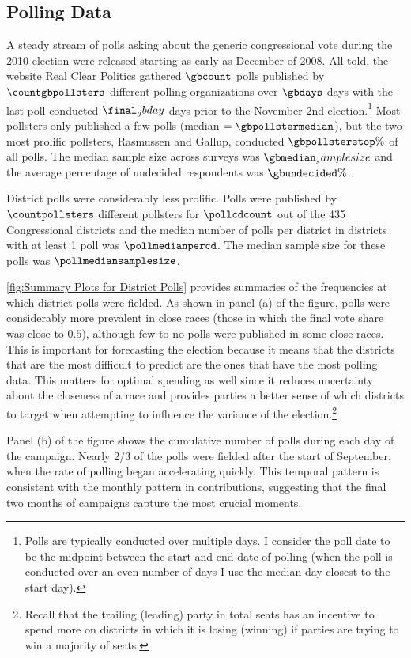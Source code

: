 \documentclass[12pt,final,fleqn]{article}
\theoremstyle{plain}
\begin{document}
\subsection{Polling Data}
A steady stream of polls asking about the generic congressional vote during the 2010 election were released starting as early as December of 2008. All told, the website \href{http://www.realclearpolitics.com/}{Real Clear Politics} gathered  $\gbcount$ polls published by $\countgbpollsters$ different polling organizations over $\gbdays$ days with the last poll conducted $\final_gbday$ days prior to the November 2nd election.\footnote{Polls are typically conducted over multiple days. I consider the poll date to be the midpoint between the start and end date of polling (when the poll is conducted over an even number of days I use the median day closest to the start day).} Most pollsters only published a few polls (median $= \gbpollstermedian$), but the two most prolific pollsters,  Rasmussen and Gallup, conducted $\gbpollsterstop\%$ of all polls. The median sample size across surveys was $\gbmedian_samplesize$ and the average percentage of undecided respondents was $\gbundecided\%$.

District polls were considerably less prolific. Polls were published by $\countpollsters$ different pollsters for $\pollcdcount$ out of the 435 Congressional districts and the median number of polls per district in districts with at least 1 poll was $\pollmedianpercd$. The median sample size for these polls was $\pollmediansamplesize$. 

\autoref{fig:Summary Plots for District Polls} provides summaries of the frequencies at which district polls were fielded. As shown in panel (a) of the figure, polls were considerably more prevalent in close races (those in which the final vote share was close to $0.5$), although few to no polls were published in some close races. This is important for forecasting the election because it means that the districts that are the most difficult to predict are the ones that have the most polling data. This matters for optimal spending as well since it reduces uncertainty about the closeness of a race and provides parties a better sense of which districts to target when attempting to influence the variance of the election.\footnote{Recall that the trailing (leading) party in total seats has an incentive to spend more on districts in which it is losing (winning) if parties are trying to win a majority of seats.}

Panel (b) of the figure shows the cumulative number of polls during each day of the campaign. Nearly 2/3 of the polls were fielded after the start of September, when the rate of polling began accelerating quickly. This temporal pattern is consistent with the monthly pattern in contributions, suggesting that the final two months of campaigns capture the most crucial moments.
\end{document}
